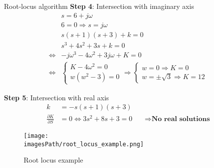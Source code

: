 \begin{exampleblock}{Root-locus algorithm}
    \textbf{Step 4}: Intersection with imaginary axis
    \begin{align*}
        &s = 6 + j\omega \\
        &6 = 0 \Rightarrow s = j\omega \\
        &s(s+1)(s+3) + k = 0 \\
        &s^3 + 4s^2 + 3s + k = 0  \\
        \Leftrightarrow &-j\omega^3 - 4\omega^2 + 3j\omega + K = 0 \\
        \Leftrightarrow 
        &\begin{cases}
            K - 4\omega^2 = 0 \\
            w(w^2-3) = 0  
        \end{cases}
        \Rightarrow
        \begin{cases}
            w = 0 \Rightarrow K = 0 \\
            w = \pm\sqrt{3} \Rightarrow K = 12
        \end{cases}
    \end{align*}

    \textbf{Step 5}: Intersection with real axis 
    \begin{align*}
        k &= -s(s+1)(s+3) \\
        \frac{\partial K}{\partial S} &= 0 \Leftrightarrow 3s^2 + 8s + 3 = 0
        &\quad \Rightarrow \textbf{No real solutions}
    \end{align*}
\end{exampleblock}
\begin{figure}[!h]
    \centering
    \texttt{[image: \\imagesPath/root\_locus\_example.png]}
    \caption{Root locus example}
    \label{fig:root_locus_example}
\end{figure}



